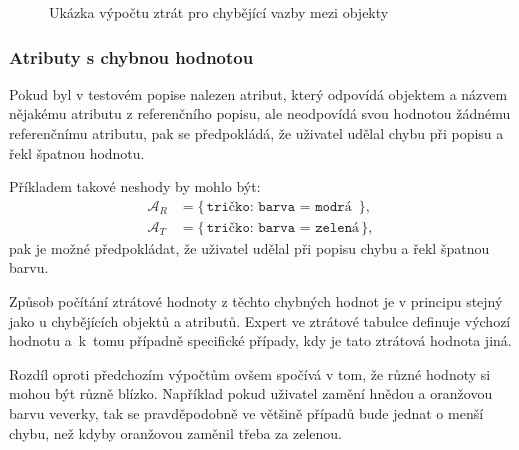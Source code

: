 \begin{figure}[H]
	\caption{Ukázka výpočtu ztrát pro chybějící vazby mezi objekty}\label{fig:example_missing_triplets}
\end{figure}

\subsubsection{Atributy s chybnou hodnotou}
Pokud byl v testovém popise nalezen atribut, který odpovídá objektem a názvem nějakému atributu z referenčního popisu,
ale neodpovídá svou hodnotou žádnému referenčnímu atributu, pak se předpokládá, že uživatel udělal chybu při popisu a řekl špatnou hodnotu.

Příkladem takové neshody by mohlo být:
\begin{align*}
	\mathcal{A}_{R} & = \bigl\{ \, \texttt{tričko: barva = modrá } \, \bigr\}, \\
	\mathcal{A}_{T} & = \bigl\{ \, \texttt{tričko: barva = zelená} \, \bigr\},
\end{align*}
pak je možné předpokládat, že uživatel udělal při popisu chybu a řekl špatnou barvu.

Způsob počítání ztrátové hodnoty z těchto chybných hodnot je v principu stejný jako u chybějících objektů a atributů.
Expert ve ztrátové tabulce definuje výchozí hodnotu a~k~tomu případně specifické případy, kdy je tato ztrátová hodnota jiná.

Rozdíl oproti předchozím výpočtům ovšem spočívá v tom, že různé hodnoty si mohou být různě blízko.
Například pokud uživatel zamění hnědou a oranžovou barvu veverky, tak se pravděpodobně ve většině případů bude jednat o menší chybu,
než kdyby oranžovou zaměnil třeba za zelenou.

